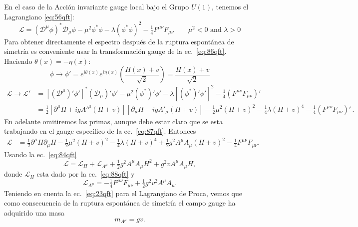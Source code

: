 \begin{frame}
En el caso de la Acción invariante gauge local bajo el Grupo $U(1)$, tenemos el Lagrangiano \eqref{eq:56qft}:
\begin{equation}
  \label{eq:89qft}
  \mathcal{L}=\left(\mathcal{D}^\mu\phi\right)^*\mathcal{D}_\mu\phi-\mu^2\phi^*\phi-\lambda\left(\phi^*\phi\right)^2-\tfrac{1}{4}F^{\mu\nu}F_{\mu\nu}
  \qquad 
  \mu^2\lt 0\text{ and } \lambda\gt 0
\end{equation}
Para obtener directamente el espectro después de la ruptura espontánea de simetría es conveniente usar la transformación gauge de la ec.~\eqref{eq:86qft}. Haciendo $\theta(x)=-\eta(x)$:
\begin{equation}
\label{eq:87qft}
   \phi\to\phi'=e^{i\theta(x)}e^{i\eta(x)}\left(\frac{H(x)+v}{\sqrt{2}}\right)=\frac{H(x)+v}{\sqrt{2}}
\end{equation}
\begin{align}
  \mathcal{L}\to\mathcal{L}' &=\left[\left(\mathcal{D}^\mu\right)'\phi'\right]^*\left(\mathcal{D}_\mu\right)'\phi'-\mu^2\left(\phi^*\right)'\phi'-\lambda\left[\left(\phi^*\right)'\phi'\right]^2-\tfrac{1}{4}\left(F^{\mu\nu}F_{\mu\nu}\right)'\nonumber\\
 &=\tfrac{1}{2}\left[\partial^\mu H+ig{A'}^\mu(H+v)\right]\left[\partial_\mu H-ig{A'}_\mu(H+v)\right]-\tfrac{1}{2}\mu^2(H+v)^2-\tfrac{1}{4}\lambda(H+v)^4-\tfrac{1}{4}\left(F^{\mu\nu}F_{\mu\nu}\right)'\,.
\end{align}
En adelante omitiremos las primas, aunque debe estar claro que se esta trabajando en el gauge específico de la ec.~\eqref{eq:87qft}. Entonces
\begin{align}
  \mathcal{L}&=\tfrac{1}{2}\partial^\mu H\partial_\mu H-\tfrac{1}{2}\mu^2(H+v)^2-
  \tfrac{1}{4}\lambda(H+v)^4+\tfrac{1}{2}g^2A^\mu A_\mu(H+v)^2
  -\tfrac{1}{4}F^{\mu\nu}F_{\mu\nu}.
\end{align}
Usando la ec.~\eqref{eq:84qft}
\begin{equation}
  \label{eq:94qft}
  \mathcal{L}=\mathcal{L}_H+\mathcal{L}_{A^\mu}+\tfrac{1}{2}g^2A^\mu A_\mu H^2+g^2vA^\mu A_\mu H,
\end{equation}
donde $\mathcal{L}_H$ esta dado por la ec.~\eqref{eq:88qft} y
\begin{equation}
  \mathcal{L}_{A^\mu}=-\tfrac{1}{4}F^{\mu\nu}F_{\mu\nu}+\tfrac{1}{2}g^2v^2A^\mu A_\mu.
\end{equation}
Teniendo en cuenta la ec.~\eqref{eq:23qft} para el Lagrangiano de Proca, vemos que como consecuencia de la ruptura espontánea de simetría el campo gauge ha adquirido una masa
\begin{equation}
  m_{A^\mu}=gv.
\end{equation}


\end{frame}

